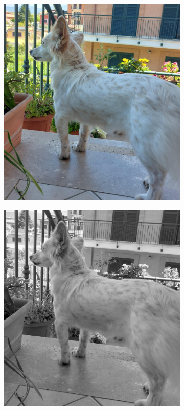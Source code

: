 \begin{figure}[h]
    \centering
    \begin{subfigure}[t]{0.4\linewidth}
        \includegraphics[width=\linewidth]{Figures/example.jpeg}
    \end{subfigure}
    \hspace{2cm}
    \begin{subfigure}[t]{0.4\linewidth}
        \includegraphics[width=\linewidth]{Figures/example_gray.jpeg}
    \end{subfigure}
\end{figure}
